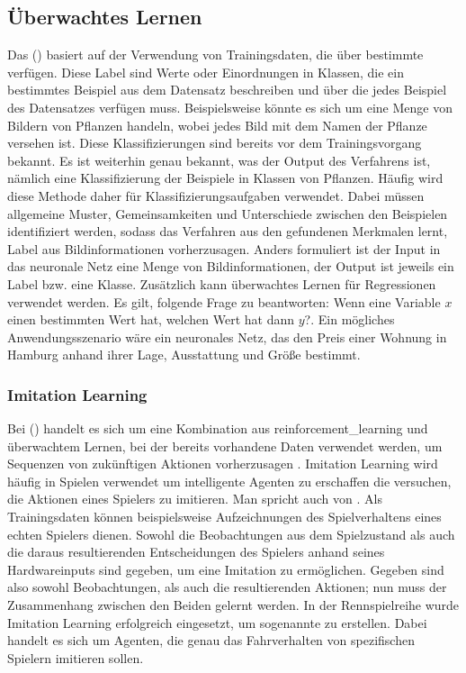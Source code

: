 \subsection{Überwachtes Lernen}\label{supervised_learning}
Das  () basiert auf der Verwendung von Trainingsdaten, die über bestimmte  verfügen. Diese Label sind Werte oder Einordnungen in Klassen, die ein bestimmtes Beispiel aus dem Datensatz beschreiben und über die jedes Beispiel des Datensatzes verfügen muss. Beispielsweise könnte es sich um eine Menge von Bildern von Pflanzen handeln, wobei jedes Bild mit dem Namen der Pflanze versehen ist. Diese Klassifizierungen sind bereits vor dem Trainingsvorgang bekannt. Es ist weiterhin genau bekannt, was der Output des Verfahrens ist, nämlich eine Klassifizierung der Beispiele in Klassen von Pflanzen.
Häufig wird diese Methode daher für Klassifizierungsaufgaben verwendet. Dabei müssen allgemeine Muster, Gemeinsamkeiten und Unterschiede zwischen den Beispielen identifiziert werden, sodass das Verfahren aus den gefundenen Merkmalen lernt, Label aus Bildinformationen vorherzusagen. Anders formuliert ist der Input in das neuronale Netz eine Menge von Bildinformationen, der Output ist jeweils ein Label bzw. eine Klasse.
Zusätzlich kann überwachtes Lernen für Regressionen verwendet werden. Es gilt, folgende Frage zu beantworten: \glqq{}Wenn eine Variable $x$ einen bestimmten Wert hat, welchen Wert hat dann $y$?\grqq{}. Ein mögliches Anwendungsszenario wäre ein neuronales Netz, das den Preis einer Wohnung in Hamburg anhand ihrer Lage, Ausstattung und Größe bestimmt.

\subsubsection{Imitation Learning}\label{imitation_learning}
Bei  () handelt es sich um eine Kombination aus \ac{reinforcement_learning} und überwachtem Lernen, bei der bereits vorhandene Daten verwendet werden, um Sequenzen von zukünftigen Aktionen vorherzusagen \cite{icml_imitation}. Imitation Learning wird häufig in Spielen verwendet um intelligente Agenten zu erschaffen die versuchen, die Aktionen eines Spielers zu imitieren. Man spricht auch von . Als Trainingsdaten können beispielsweise Aufzeichnungen des Spielverhaltens eines echten Spielers dienen. Sowohl die Beobachtungen aus dem Spielzustand als auch die daraus resultierenden Entscheidungen des Spielers anhand seines Hardwareinputs sind gegeben, um eine Imitation zu ermöglichen. Gegeben sind also sowohl Beobachtungen, als auch die resultierenden Aktionen; nun muss der Zusammenhang zwischen den Beiden gelernt werden. In der Rennspielreihe  wurde Imitation Learning erfolgreich eingesetzt, um sogenannte  \cite{forza} zu erstellen. Dabei handelt es sich um Agenten, die genau das Fahrverhalten von spezifischen Spielern imitieren sollen.


